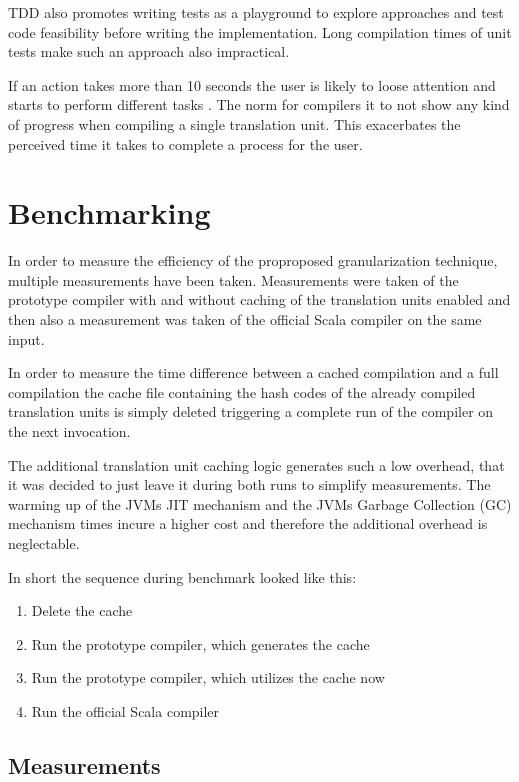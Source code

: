 \documentclass{VUMIFPSbakalaurinis}
\begin{document}
TDD also promotes writing tests as a playground to explore approaches and test code feasibility before writing the implementation.
Long compilation times of unit tests make such an approach also impractical.

If an action takes more than 10 seconds the user is likely to loose attention and starts to perform different tasks \cite{Usability}.
The norm for compilers it to not show any kind of progress when compiling a single translation unit.
This exacerbates the perceived time it takes to complete a process for the user\cite{Usability}.


\section{Benchmarking}
In order to measure the efficiency of the proproposed granularization technique, multiple measurements have been taken.
Measurements were taken of the prototype compiler with and without caching of the translation units enabled and then also a measurement was taken of the official Scala compiler on the same input.

In order to measure the time difference between a cached compilation and a full compilation the cache file containing the hash codes of the already compiled translation units is simply deleted triggering a complete run of the compiler on the next invocation.

The additional translation unit caching logic generates such a low overhead, that it was decided to just leave it during both runs to simplify measurements.
The warming up of the JVMs JIT mechanism and the JVMs Garbage Collection (GC) mechanism times incure a higher cost and therefore the additional overhead is neglectable.

In short the sequence during benchmark looked like this:

\begin{enumerate}
\item{Delete the cache}
\item{Run the prototype compiler, which generates the cache}
\item{Run the prototype compiler, which utilizes the cache now}
\item{Run the official Scala compiler}
\end{enumerate}

\subsection{Measurements}
\end{document}
